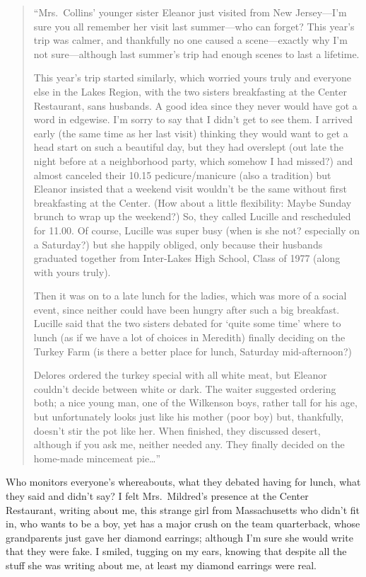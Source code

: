 \begin{quote}
``Mrs.~Collins' younger sister Eleanor just visited from New
Jersey---I'm sure you all remember her visit last summer---who can
forget? This year's trip was calmer, and thankfully no one caused a
scene---exactly why I'm not sure---although last summer's trip had
enough scenes to last a lifetime.

This year's trip started similarly, which worried yours truly and
everyone else in the Lakes Region, with the two sisters breakfasting at
the Center Restaurant, sans husbands. A good idea since they never would
have got a word in edgewise. I'm sorry to say that I didn't get to see
them. I arrived early (the same time as her last visit) thinking they
would want to get a head start on such a beautiful day, but they had
overslept (out late the night before at a neighborhood party, which
somehow I had missed?) and almost canceled their 10.15 pedicure/manicure
(also a tradition) but Eleanor insisted that a weekend visit wouldn't be
the same without first breakfasting at the Center. (How about a little
flexibility: Maybe Sunday brunch to wrap up the weekend?) So, they
called Lucille and rescheduled for 11.00. Of course, Lucille was super
busy (when is she not? especially on a Saturday?) but she happily
obliged, only because their husbands graduated together from Inter-Lakes
High School, Class of 1977 (along with yours truly).

Then it was on to a late lunch for the ladies, which was more of a
social event, since neither could have been hungry after such a big
breakfast. Lucille said that the two sisters debated for `quite some
time' where to lunch (as if we have a lot of choices in Meredith)
finally deciding on the Turkey Farm (is there a better place for lunch,
Saturday mid-afternoon?)

Delores ordered the turkey special with all white meat, but Eleanor
couldn't decide between white or dark. The waiter suggested ordering
both; a nice young man, one of the Wilkenson boys, rather tall for his
age, but unfortunately looks just like his mother (poor boy) but,
thankfully, doesn't stir the pot like her. When finished, they discussed
desert, although if you ask me, neither needed any. They finally decided
on the home-made mincemeat pie\ldots''
\end{quote}

\noindent Who monitors everyone's whereabouts, what they debated having
for lunch, what they said and didn't say? I felt Mrs.~Mildred's presence
at the Center Restaurant, writing about me, this strange girl from
Massachusetts who didn't fit in, who wants to be a boy, yet has a major
crush on the team quarterback, whose grandparents just gave her diamond
earrings; although I'm sure she would write that they were fake. I
smiled, tugging on my ears, knowing that despite all the stuff she was
writing about me, at least my diamond earrings were real.

